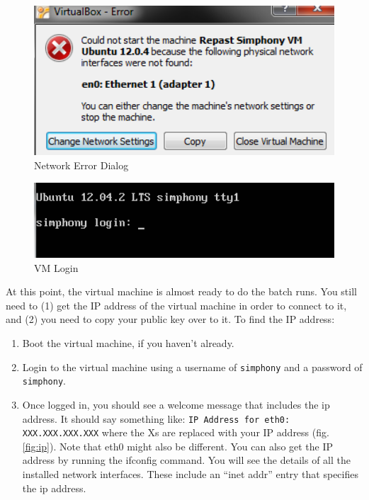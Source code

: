 \documentclass[11pt]{amsart}
\begin{document}
\begin{figure}[h]
\begin{center}
\vspace{.2in}
\centerline {
\includegraphics[width=4.5in]{images/network_error.png}
}
\caption{Network Error Dialog}
\label{fig:network_error}
\end{center}
\end{figure}

\begin{figure}[h]
\begin{center}
\vspace{.2in}
\centerline {
\includegraphics[width=4.5in]{images/vm_login.png}
}
\caption{VM Login}
\label{fig:vm_login}
\end{center}
\end{figure}

At this point, the virtual machine is almost ready to do the batch runs. You still need to (1) get the IP address of the virtual machine in order to connect to it, and (2) you need to copy your public key over to it. To find the IP address:

\begin{enumerate}
\item Boot the virtual machine, if you haven't already.
\item Login to the virtual machine using a username of {\tt simphony} and a password of {\tt simphony}.
\item Once logged in, you should see a welcome message that includes the ip address. It should say something like: {\tt IP Address for eth0: XXX.XXX.XXX.XXX} where the Xs are replaced with your IP address (fig. \ref{fig:ip}). Note that eth0 might also be different. You can also get the IP address by running the ifconfig command. You will see the details of all the installed network interfaces. These include an ``inet addr'' entry that specifies the ip address.
\end{enumerate}
\end{document}
